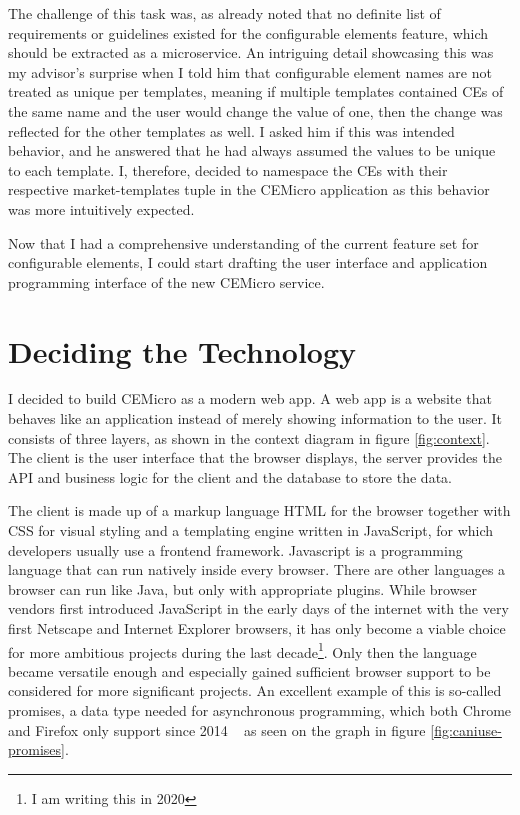 The challenge of this task was, as already noted that no definite list of requirements or guidelines existed for the configurable elements feature, which should be extracted as a microservice. An intriguing detail showcasing this was my advisor's surprise when I told him that configurable element names are not treated as unique per templates, meaning if multiple templates contained CEs of the same name and the user would change the value of one, then the change was reflected for the other templates as well. I asked him if this was intended behavior, and he answered that he had always assumed the values to be unique to each template. I, therefore, decided to namespace the CEs with their respective market-templates tuple in the CEMicro application as this behavior was more intuitively expected.

Now that I had a comprehensive understanding of the current feature set for configurable elements, I could start drafting the user interface and application programming interface of the new CEMicro service.


\section{Deciding the Technology}
\label{sec:arch:technology}

I decided to build CEMicro as a modern web app. A web app is a website that behaves like an application instead of merely showing information to the user. It consists of three layers, as shown in the context diagram in figure \ref{fig:context}. The client is the user interface that the browser displays, the server provides the API and business logic for the client and the database to store the data.

The client is made up of a markup language HTML for the browser together with CSS for visual styling and a templating engine written in JavaScript, for which developers usually use a frontend framework. Javascript is a programming language that can run natively inside every browser. There are other languages a browser can run like Java, but only with appropriate plugins. While browser vendors first introduced JavaScript in the early days of the internet with the very first Netscape and Internet Explorer browsers, it has only become a viable choice for more ambitious projects during the last decade\footnote{I am writing this in 2020}. Only then the language became versatile enough and especially gained sufficient browser support to be considered for more significant projects. An excellent example of this is so-called promises, a data type needed for asynchronous programming, which both Chrome and Firefox only support since 2014 ~\cite{caniuse.2020} as seen on the graph in figure \ref{fig:caniuse-promises}.

